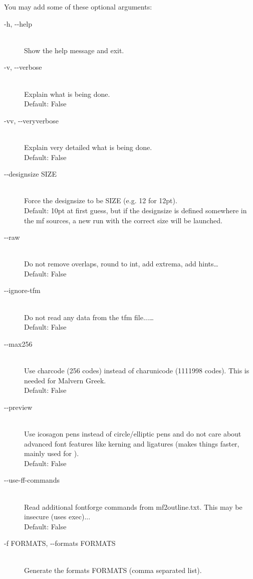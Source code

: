 \documentclass{scrartcl}
\begin{document}
You may add some of these optional arguments:
\begin{description}
	\item[-h, -{}-help] \hfill \\
		Show the help message and exit.
	\item[-v, -{}-verbose ] \hfill \\
		Explain what is being done.\\
		Default: False
	\item[-vv, -{}-veryverbose] \hfill \\
		Explain very detailed what is being done.\\
		Default: False
	\item[-{}-designsize SIZE] \hfill \\
		Force the designsize to be SIZE (e.g. 12 for 12pt).\\
		Default: 10pt at first guess, but if the 
		designsize is defined somewhere in the mf sources,
		a new run with the correct size will be launched.
	\item[-{}-raw] \hfill \\
		Do not remove overlaps, round to int, add extrema, add hints\ldots\\
		Default: False
	\item[-{}-ignore-tfm] \hfill \\
		Do not read any data from the tfm file...\ldots\\
		Default: False
	\item[-{}-max256] \hfill \\	
		Use charcode (256 codes) instead of charunicode
		(1111998 codes). This is needed for Malvern Greek.\\
		Default: False
	\item[-{}-preview] \hfill \\
		Use icosagon pens instead of circle/elliptic pens and do not 
		care about advanced font features like kerning and ligatures 
		(makes things faster, mainly used for ).\\
		Default: False
	\item[-{}-use-ff-commands] \hfill \\
		Read additional fontforge commands from mf2outline.txt.
		This may be insecure (uses exec)...\\
		Default: False
	\item[-f FORMATS, -{}-formats FORMATS] \hfill \\
		Generate the formats FORMATS (comma separated list).\\

\end{description}
\end{document}
